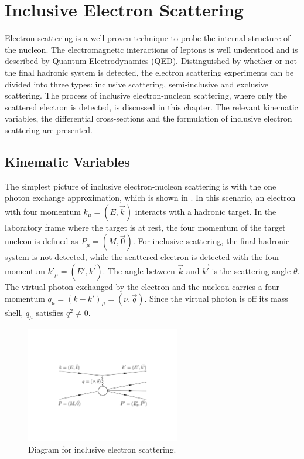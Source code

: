 
\chapter{Inclusive Electron Scattering}
\label{C2}

Electron scattering is a well-proven technique to probe the internal structure of the nucleon. The electromagnetic interactions of leptons is well understood and is described by Quantum Electrodynamics (QED). Distinguished by whether or not the final hadronic system is detected, the electron scattering experiments can be divided into three types: inclusive scattering, semi-inclusive and exclusive scattering. The process of inclusive electron-nucleon scattering, where only the scattered electron is detected, is discussed in this chapter. The relevant kinematic variables, the differential cross-sections and the formulation of inclusive electron scattering are presented.

\section{Kinematic Variables}
\label{C2S1}

The simplest picture of inclusive electron-nucleon scattering is with the one photon exchange approximation, which is shown in . In this scenario, an electron with four momentum $k_\mu=(E,\vec{k})$ interacts with a hadronic target. In the laboratory frame where the target is at rest, the four momentum of the target nucleon is defined as $P_\mu=(M,\vec{0})$. For inclusive scattering, the final hadronic system is not detected, while the scattered electron is detected with the four momentum $k'_\mu=(E',\vec{k'})$. The angle between $\vec{k}$ and $\vec{k'}$ is the scattering angle $\theta$. The virtual photon exchanged by the electron and the nucleon carries a four-momentum $q_\mu=(k-k')_\mu=(\nu,\vec{q})$. Since the virtual photon is off its mass shell, $q_\mu$ satisfies $q^2\ne 0$.

\begin{figure}[tb!]
  \centering
  \includegraphics[width=0.6\textwidth]{figs/inclusive-scattering.pdf}
  \caption[Diagram for inclusive electron scattering.]{Diagram for inclusive electron scattering. \label{C2S1F1}}
\end{figure}

